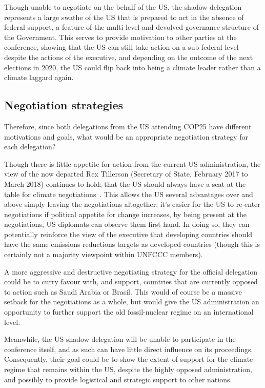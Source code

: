 Though unable to negotiate on the behalf of the US, the shadow
delegation represents a large swathe of the US that is prepared to act
in the absence of federal support, a feature of the multi-level and
devolved governance structure of the Government. This serves to
provide motivation to other parties at the conference, showing that the US can still take action on a sub-federal level despite the actions of the executive, and depending on the outcome of the next elections in 2020, the US could
flip back into being a climate leader rather than a climate laggard
again.

\subsection{Negotiation strategies}

Therefore, since both delegations from the US attending COP25 have
different motivations and goals, what would be an appropriate
negotiation strategy for each delegation?

Though there is little appetite for action from the current US
administration, the view of the now departed Rex Tillerson
(Secretary of State, February 2017 to March 2018) continues to hold; that the US should always have
a seat at the table for climate negotiations~\cite{aei292720}. This allows the US
several advantages over and above simply leaving the negotiations
altogether; it’s easier for the US to re-enter negotiations if
political appetite for change increases, by being present at the
negotiations, US diplomats can observe them first hand. In doing so, they can
potentially reinforce the view of the executive that developing
countries should have the same emissions reductions targets as
developed countries (though this is certainly not a majority
viewpoint within UNFCCC members).

A more aggressive and destructive negotiating strategy for the
official delegation could be to curry favour with, and support,
countries that are currently opposed to action such as Saudi Arabia or
Brasil. This would of course be a massive setback for the negotiations
as a whole, but would give the US administration an opportunity to
further support the old fossil-nuclear regime on an international level.

Meanwhile, the US shadow delegation will be unable to participate in
the conference itself, and as such can have little direct influence on
its proceedings. Consequently, their goal could be
to show the extent of support for the climate regime that remains
within the US, despite the highly opposed administration, and possibly
to provide logistical and strategic support to other nations.


